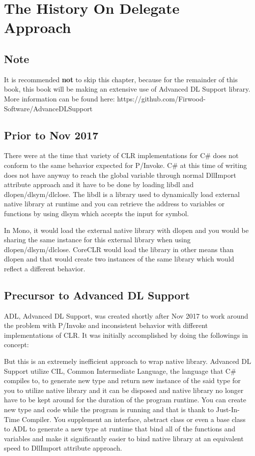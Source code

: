 \chapter{The History On Delegate Approach}
\section{Note}
It is recommended \textbf{not} to skip this chapter, because for the remainder of this book, this book will be making an extensive use of Advanced DL Support library. More information can be found here: https://github.com/Firwood-Software/AdvanceDLSupport

\section{Prior to Nov 2017}
There were at the time that variety of CLR implementations for C\# does not conform to the same behavior expected for P/Invoke. C\# at this time of writing does not have anyway to reach the global variable through normal DllImport attribute approach and it have to be done by loading libdl and dlopen/dlsym/dlclose. The libdl is a library used to dynamically load external native library at runtime and you can retrieve the address to variables or functions by using dlsym which accepts the input for symbol.

In Mono, it would load the external native library with dlopen and you would be sharing the same instance for this external library when using dlopen/dlsym/dlclose. CoreCLR would load the library in other means than dlopen and that would create two instances of the same library which would reflect a different behavior.
\newpage
\section{Precursor to Advanced DL Support}
ADL, Advanced DL Support, was created shortly after Nov 2017 to work around the problem with P/Invoke and inconsistent behavior with different implementations of CLR. It was initially accomplished by doing the followings in concept:



But this is an extremely inefficient approach to wrap native library. Advanced DL Support utilize CIL, Common Intermediate Language, the language that C\# compiles to, to generate new type and return new instance of the said type for you to utilize native library and it can be disposed and native library no longer have to be kept around for the duration of the program runtime. You can create new type and code while the program is running and that is thank to Just-In-Time Compiler. You supplement an interface, abstract class or even a base class to ADL to generate a new type at runtime that bind all of the functions and variables and make it significantly easier to bind native library at an equivalent speed to DllImport attribute approach.

